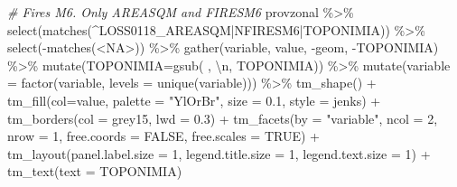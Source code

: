 \documentclass[10pt,landscape,a3paper]{article}
\newenvironment{Shaded}{\begin{snugshade}}{\end{snugshade}}
\newcommand{\AttributeTok}[1]{\textcolor[rgb]{0.77,0.63,0.00}{#1}}
\newcommand{\CommentTok}[1]{\textcolor[rgb]{0.56,0.35,0.01}{\textit{#1}}}
\newcommand{\ConstantTok}[1]{\textcolor[rgb]{0.00,0.00,0.00}{#1}}
\newcommand{\DecValTok}[1]{\textcolor[rgb]{0.00,0.00,0.81}{#1}}
\newcommand{\FloatTok}[1]{\textcolor[rgb]{0.00,0.00,0.81}{#1}}
\newcommand{\FunctionTok}[1]{\textcolor[rgb]{0.00,0.00,0.00}{#1}}
\newcommand{\NormalTok}[1]{#1}
\newcommand{\SpecialCharTok}[1]{\textcolor[rgb]{0.00,0.00,0.00}{#1}}
\newcommand{\StringTok}[1]{\textcolor[rgb]{0.31,0.60,0.02}{#1}}
\begin{document}
\begin{Shaded}
\begin{Highlighting}[]
\CommentTok{\# Fires M6. Only AREASQM and FIRESM6}
\NormalTok{provzonal }\SpecialCharTok{\%\textgreater{}\%} \FunctionTok{select}\NormalTok{(}\FunctionTok{matches}\NormalTok{(}\StringTok{\textquotesingle{}\^{}LOSS0118\_AREASQM|NFIRESM6|TOPONIMIA\textquotesingle{}}\NormalTok{)) }\SpecialCharTok{\%\textgreater{}\%} \FunctionTok{select}\NormalTok{(}\SpecialCharTok{{-}}\FunctionTok{matches}\NormalTok{(}\StringTok{\textquotesingle{}\textless{}NA\textgreater{}\textquotesingle{}}\NormalTok{)) }\SpecialCharTok{\%\textgreater{}\%} 
  \FunctionTok{gather}\NormalTok{(variable, value, }\SpecialCharTok{{-}}\NormalTok{geom, }\SpecialCharTok{{-}}\NormalTok{TOPONIMIA) }\SpecialCharTok{\%\textgreater{}\%}
  \FunctionTok{mutate}\NormalTok{(}\AttributeTok{TOPONIMIA=}\FunctionTok{gsub}\NormalTok{(}\StringTok{\textquotesingle{} \textquotesingle{}}\NormalTok{, }\StringTok{\textquotesingle{}}\SpecialCharTok{\textbackslash{}n}\StringTok{\textquotesingle{}}\NormalTok{, TOPONIMIA)) }\SpecialCharTok{\%\textgreater{}\%} 
  \FunctionTok{mutate}\NormalTok{(}\AttributeTok{variable =} \FunctionTok{factor}\NormalTok{(variable, }\AttributeTok{levels =} \FunctionTok{unique}\NormalTok{(variable))) }\SpecialCharTok{\%\textgreater{}\%} 
  \FunctionTok{tm\_shape}\NormalTok{() }\SpecialCharTok{+}
  \FunctionTok{tm\_fill}\NormalTok{(}\AttributeTok{col=}\StringTok{\textquotesingle{}value\textquotesingle{}}\NormalTok{, }\AttributeTok{palette =} \StringTok{"YlOrBr"}\NormalTok{, }\AttributeTok{size =} \FloatTok{0.1}\NormalTok{, }\AttributeTok{style =} \StringTok{\textquotesingle{}jenks\textquotesingle{}}\NormalTok{) }\SpecialCharTok{+}
  \FunctionTok{tm\_borders}\NormalTok{(}\AttributeTok{col =} \StringTok{\textquotesingle{}grey15\textquotesingle{}}\NormalTok{, }\AttributeTok{lwd =} \FloatTok{0.3}\NormalTok{) }\SpecialCharTok{+}
  \FunctionTok{tm\_facets}\NormalTok{(}\AttributeTok{by =} \StringTok{"variable"}\NormalTok{, }\AttributeTok{ncol =} \DecValTok{2}\NormalTok{, }\AttributeTok{nrow =} \DecValTok{1}\NormalTok{, }\AttributeTok{free.coords =} \ConstantTok{FALSE}\NormalTok{, }\AttributeTok{free.scales =} \ConstantTok{TRUE}\NormalTok{) }\SpecialCharTok{+}
  \FunctionTok{tm\_layout}\NormalTok{(}\AttributeTok{panel.label.size =} \DecValTok{1}\NormalTok{, }\AttributeTok{legend.title.size =} \DecValTok{1}\NormalTok{, }\AttributeTok{legend.text.size =} \DecValTok{1}\NormalTok{) }\SpecialCharTok{+}
  \FunctionTok{tm\_text}\NormalTok{(}\AttributeTok{text =} \StringTok{\textquotesingle{}TOPONIMIA\textquotesingle{}}\NormalTok{)}
\end{Highlighting}
\end{Shaded}
\end{document}
